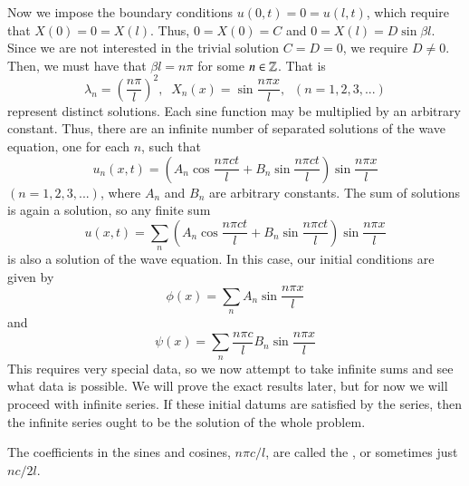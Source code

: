 \documentclass[12pt, a4paper, oneside, openright, titlepage]{book}
\begin{document}
Now we impose the boundary conditions $u(0,t) = 0 = u(l,t)$, which require that $X(0) = 0 = X(l)$. Thus, $0 = X(0) = C$ and $0 = X(l) = D\sin\beta l$. Since we are not interested in the trivial solution $C=D=0$, we require $D \neq 0$. Then, we must have that $\beta l = n\pi$ for some $n \in \mathbb Z$. That is \begin{equation*}
    \lambda_n = \left(\frac{n\pi}{l}\right)^2,\;\;X_n(x) = \sin\frac{n\pi x}{l}, \;\;(n=1,2,3,...)
\end{equation*}
represent distinct solutions. Each sine function may be multiplied by an arbitrary constant. Thus, there are an infinite number of separated solutions of the wave equation, one for each $n$, such that \begin{equation*}
    u_n(x,t) = \left(A_n\cos\frac{n\pi ct}{l}+B_n\sin\frac{n\pi ct}{l}\right)\sin\frac{n\pi x}{l}
\end{equation*}
$(n=1,2,3,...)$, where $A_n$ and $B_n$ are arbitrary constants. The sum of solutions is again a solution, so any finite sum \begin{equation}
    \boxed{u(x,t) = \sum_{n}\left(A_n\cos\frac{n\pi ct}{l}+B_n\sin\frac{n\pi ct}{l}\right)\sin\frac{n\pi x}{l}}
\end{equation}
is also a solution of the wave equation. In this case, our initial conditions are given by \begin{equation}
    \phi(x) = \sum_nA_n\sin\frac{n\pi x}{l}
\end{equation}
and \begin{equation}
    \psi(x) = \sum_{n}\frac{n\pi c}{l}B_n\sin\frac{n\pi x}{l}
\end{equation}
This requires very special data, so we now attempt to take infinite sums and see what data is possible. We will prove the exact results later, but for now we will proceed with infinite series. If these initial datums are satisfied by the series, then the infinite series ought to be the solution of the whole problem.

The coefficients in the sines and cosines, $n\pi c/l$, are called the , or sometimes just $nc/2l$.
\end{document}
